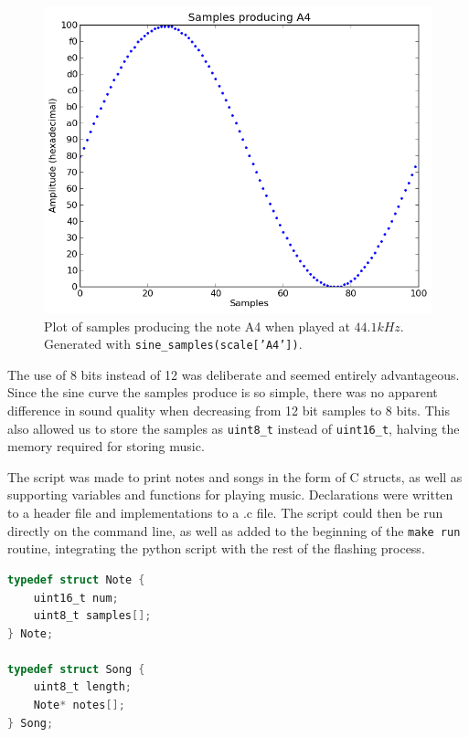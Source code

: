 \begin{figure}[h!]
\includegraphics[width=\linewidth]{img/A4.png}
\caption{Plot of samples producing the note A4 when played at $44.1kHz$. Generated with \texttt{sine\_samples(scale['A4'])}.}
\label{fig:A4samples}
\end{figure}

The use of 8 bits instead of 12 was deliberate and seemed entirely advantageous. Since the sine curve the samples produce is so simple, there was no apparent difference in sound quality when decreasing from 12 bit samples to 8 bits. This also allowed us to store the samples as \texttt{uint8\_t} instead of \texttt{uint16\_t}, halving the memory required for storing music.

The script was made to print notes and songs in the form of C structs, as well as supporting variables and functions for playing music. Declarations were written to a header file and implementations to a .c file. The script could then be run directly on the command line, as well as added to the beginning of the \texttt{make run} routine, integrating the python script with the rest of the flashing process.

\begin{minipage}{\linewidth}
\begin{lstlisting}[language=C, label=structs, caption=Excerpt from music.h]
typedef struct Note {
    uint16_t num;
    uint8_t samples[];
} Note;

typedef struct Song {
    uint8_t length;
    Note* notes[];
} Song;
\end{lstlisting}
\end{minipage}

